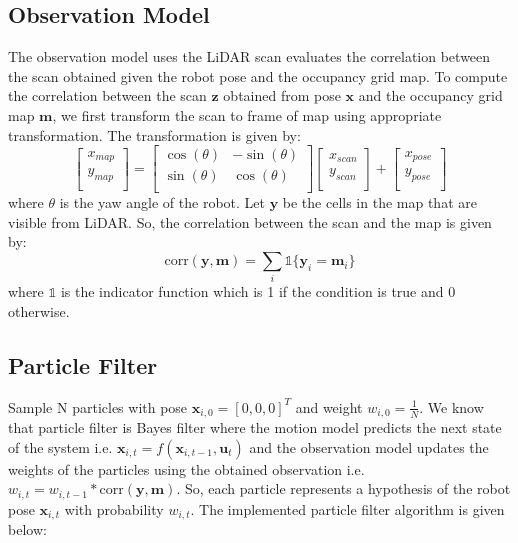 \documentclass[a4paper]{article}
\begin{document}
\subsection{Observation Model}
The observation model uses the LiDAR scan evaluates the correlation between the scan obtained given the robot pose and the occupancy grid map. To compute the correlation between the scan $\mathbf{z}$ obtained from pose $\mathbf{x}$ and the occupancy grid map $\mathbf{m}$, we first transform the scan to frame of map using appropriate transformation. The transformation is given by:
\begin{equation}
    \begin{bmatrix}
        x_{map} \\
        y_{map} \\
    \end{bmatrix} = \begin{bmatrix}
        \cos(\theta) & -\sin(\theta) \\
        \sin(\theta) & \cos(\theta) \\
    \end{bmatrix} \begin{bmatrix}
        x_{scan} \\
        y_{scan} \\
    \end{bmatrix} + \begin{bmatrix}
        x_{pose} \\
        y_{pose} \\
    \end{bmatrix}
\end{equation}
where $\theta$ is the yaw angle of the robot.
Let $\mathbf{y}$ be the cells in the map that are visible from LiDAR. So, the correlation between the scan and the map is given by:
\begin{equation}
    \text{corr}(\mathbf{y}, \mathbf{m}) = \sum_{i} \mathbb{1}\{\mathbf{y}_i = \mathbf{m}_i\}
\end{equation}
where $\mathbb{1}$ is the indicator function which is 1 if the condition is true and 0 otherwise.
\subsection{Particle Filter}
Sample N particles with pose $\mathbf{x}_{i,0} = [0,0,0]^T$ and weight $w_{i,0} = \frac{1}{N}$. We know that particle filter is Bayes filter where the motion model predicts the next state of the system i.e. $\mathbf{x}_{i,t} = f(\mathbf{x}_{i,t-1}, \mathbf{u}_t)$ and the observation model updates the weights of the particles using the obtained observation i.e. $w_{i,t} = w_{i, t-1} * \text{corr}(\mathbf{y}, \mathbf{m})$. So, each particle represents a hypothesis of the robot pose $\mathbf{x}_{i,t}$ with probability $w_{i,t}$. The implemented particle filter algorithm is given below:
\end{document}
